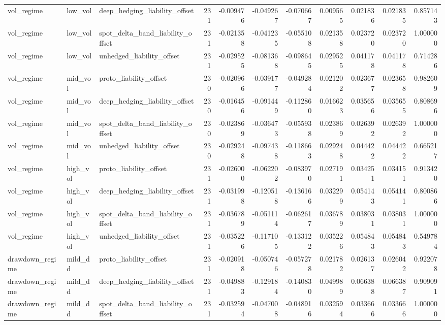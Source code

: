 \begin{tabular}{lllrrrrrrrr}
vol\_regime & low\_vol & deep\_hedging\_liability\_offset & 231 & -0.009476 & -0.049267 & -0.070667 & 0.009565 & 0.021836 & 0.021835 & 0.857143 \\
vol\_regime & low\_vol & spot\_delta\_band\_liability\_offset & 231 & -0.021358 & -0.041235 & -0.055108 & 0.021358 & 0.023720 & 0.023720 & 1.000000 \\
vol\_regime & low\_vol & unhedged\_liability\_offset & 231 & -0.029525 & -0.081368 & -0.098645 & 0.029525 & 0.041178 & 0.041178 & 0.714286 \\
vol\_regime & mid\_vol & proto\_liability\_offset & 230 & -0.020966 & -0.039177 & -0.049284 & 0.021202 & 0.023677 & 0.023658 & 0.982609 \\
vol\_regime & mid\_vol & deep\_hedging\_liability\_offset & 230 & -0.016456 & -0.091449 & -0.112860 & 0.016623 & 0.035656 & 0.035655 & 0.808696 \\
vol\_regime & mid\_vol & spot\_delta\_band\_liability\_offset & 230 & -0.023869 & -0.036473 & -0.055938 & 0.023869 & 0.026392 & 0.026392 & 1.000000 \\
vol\_regime & mid\_vol & unhedged\_liability\_offset & 230 & -0.029248 & -0.097438 & -0.118663 & 0.029248 & 0.044422 & 0.044422 & 0.665217 \\
vol\_regime & high\_vol & proto\_liability\_offset & 231 & -0.026000 & -0.062202 & -0.083970 & 0.027191 & 0.034251 & 0.034151 & 0.913420 \\
vol\_regime & high\_vol & deep\_hedging\_liability\_offset & 231 & -0.031998 & -0.120518 & -0.136166 & 0.032299 & 0.054143 & 0.054141 & 0.800866 \\
vol\_regime & high\_vol & spot\_delta\_band\_liability\_offset & 231 & -0.036789 & -0.051114 & -0.062617 & 0.036789 & 0.038031 & 0.038031 & 1.000000 \\
vol\_regime & high\_vol & unhedged\_liability\_offset & 231 & -0.035226 & -0.117105 & -0.133122 & 0.035226 & 0.054843 & 0.054843 & 0.549784 \\
drawdown\_regime & mild\_dd & proto\_liability\_offset & 231 & -0.020918 & -0.050746 & -0.057278 & 0.021782 & 0.026137 & 0.026042 & 0.922078 \\
drawdown\_regime & mild\_dd & deep\_hedging\_liability\_offset & 231 & -0.049883 & -0.129184 & -0.140830 & 0.049989 & 0.066388 & 0.066387 & 0.909091 \\
drawdown\_regime & mild\_dd & spot\_delta\_band\_liability\_offset & 231 & -0.032594 & -0.047008 & -0.048916 & 0.032594 & 0.033666 & 0.033666 & 1.000000 \\

\end{tabular}

